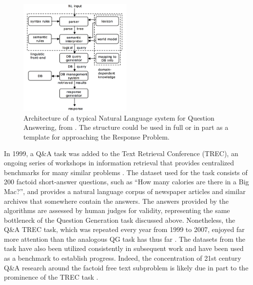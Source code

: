 \begin{figure}[h]
\centerline{%
\includegraphics[width=0.5\textwidth]{figures/NLPQA.png}}%
\caption{Architecture of a typical Natural Language system for Question Answering, from  \citep{androutsopoulos1995natural}. The structure could be used in full or in part as a template for approaching the Response Problem.}
\label{fig:NLPQA}
\end{figure}

In 1999, a Q\&A task was added to the Text Retrieval Conference (TREC), an ongoing series of workshops in information retrieval that provides centralized benchmarks for many similar problems  \citep{voorhees1999trec}. The dataset used for the task consists of 200 factoid short-answer questions, such as ``How many calories are there in a Big Mac?'', and provides a natural language corpus of newspaper articles and similar archives that somewhere contain the answers. The answers provided by the algorithms are assessed by human judges for validity, representing the same bottleneck of the Question Generation task discussed above. Nonetheless, the Q\&A TREC task, which was repeated every year from 1999 to 2007, enjoyed far more attention than the analogous QG task has thus far \citep{dang2007overview}. The datasets from the task have also been utilized consistently in subsequent work and have been used as a benchmark to establish progress. Indeed, the concentration of 21st century Q\&A research around the factoid free text subproblem is likely due in part to the prominence of the TREC task  \citep{hirschman2001natural}.


